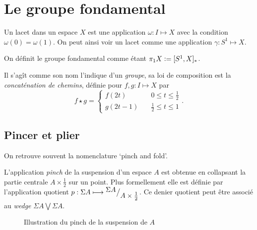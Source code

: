\documentclass[main.tex]{subfiles}
\begin{document}
	\section{Le groupe fondamental}

	\begin{definition}[Lacet]
		Un lacet dans un espace $X$ est une application $\omega : I \longmapsto X$ avec la condition $\omega(0) = \omega(1)$. On peut ainsi voir un lacet comme une application $\gamma : S^{1} \longmapsto X$.	
	\end{definition}

	\begin{definition}
		On définit le groupe fondamental comme étant $\pi_{1} X \vcentcolon= [S^{1},X]_{*}$.
	\end{definition}
	Il s'agît comme son nom l'indique d'un \emph{groupe}, sa loi de composition est la \emph{concaténation de chemins}, définie pour $f,g : I \longmapsto X$ par
	\[
	f \star g = \begin{cases}
		f(2t) \quad &0 \le t \le \frac{1}{2} \\
		g(2t - 1) \quad &\frac{1}{2} \le t \le 1
	\end{cases}
	.\] 

	\subsection{Pincer et plier}
	\begin{remark}
		On retrouve souvent la nomenclature `pinch and fold'.
	\end{remark}

		\begin{definition}[Pinch]
			L'application \emph{pinch} de la suspension d'un espace $A$ est obtenue en collapsant la partie centrale $A\times \frac{1}{2}$ sur un point. Plus formellement elle est définie par l'application quotient $p : \Sigma A \longmapsto {^{\textstyle \Sigma A}\big/_{\textstyle A \times \frac{1}{2}}}$. Ce denier quotient peut être associé au \emph{wedge} $\Sigma A \bigvee \Sigma A$.
		\end{definition}
		\begin{figure}[ht]
			\centering
			\def\svgwidth{0.7\textwidth}
			
			\caption{Illustration du pinch de la suspension de $A$}
		\end{figure}
\end{document}
